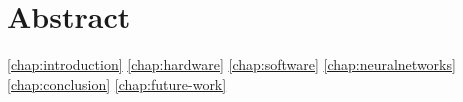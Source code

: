 \chapter*{Abstract}
\label{chap:abstract}




\ref{chap:introduction}
\ref{chap:hardware}
\ref{chap:software}
\ref{chap:neuralnetworks}
\ref{chap:conclusion}
\ref{chap:future-work}